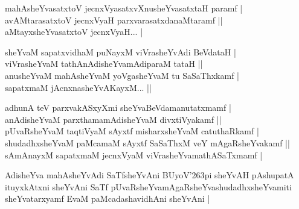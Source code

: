\begin{entry}
\begin{shl}
mahAsheYvasatxtoV jecnxVyasatxvXnusheYvasatxtaH paramf |\\[2pt]
avAMtarasatxtoV jecnxVyaH parxvarasatxdanaMtaramf ||\\[2pt]
aMtayxsheYvasatxtoV jecnxVyaH... |\\[-1pt]
\end{shl}
\medskip
{}
\medskip
{}
\medskip
\begin{shl}
sheYvaM sapatxvidhaM puNayxM viVrasheYvAdi BeVdataH |\\[2pt]
viVrasheYvaM tathAnAdisheYvamAdiparaM tataH ||\\[2pt]
anusheYvaM mahAsheYvaM yoVgasheYvaM tu SaSaThxkamf |\\[2pt]
sapatxmaM jAcnxnasheYvAKayxM... ||\\[-1pt]
\end{shl}
\medskip
{}
\medskip
{}
\medskip
\begin{shl}
adhunA teV parxvakASxyXmi sheYvaBeVdamanutatxmamf |\\[2pt]
anAdisheYvaM parxthamamAdisheYvaM divxtiVyakamf ||\\[2pt]
pUvaRsheYvaM taqtiVyaM sAyxtf misharxsheYvaM catuthaRkamf |\\[2pt]
shudadhxsheYvaM paMcamaM sAyxtf SaSaThxM veY mAgaRsheYvakamf ||\\[2pt]
sAmAnayxM sapatxmaM jecnxVyaM viVrasheYvamathASaTxmamf |\\[-1pt]
\end{shl}
\medskip
{}
\medskip
{}
\medskip
\begin{shl}
AdisheYva mahAsheYvAdi SaTfsheYvAni BUyoV{\char'263}pi sheYvAH pAshupatA ituyxkAtxni sheYvAni SaTf pUvaRsheYvamAgaRsheYvashudadhxsheYvamiti sheYvatarxyamf EvaM paMcadashavidhAni sheYvAni |
\end{shl}
\medskip
{}

\end{entry}
